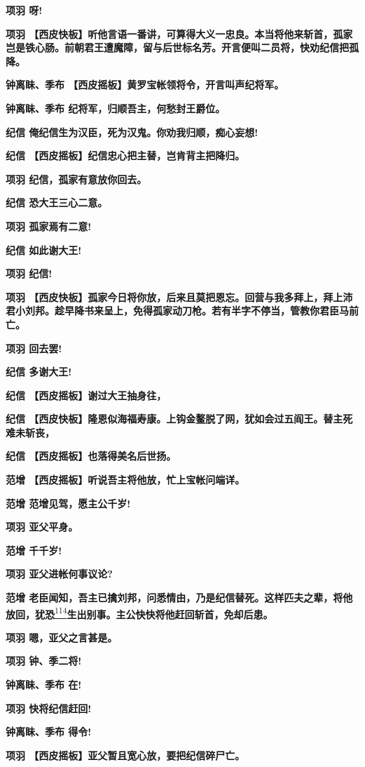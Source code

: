 \textbf{项羽 呀!}

\textbf{项羽
【西皮快板】听他言语一番讲，可算得大义一忠良。本当将他来斩首，孤家岂是铁心肠。前朝君王遭魔障，留与后世标名芳。开言便叫二员将，快劝纪信把孤降。}

\textbf{钟离眛、季布 【西皮摇板】黄罗宝帐领将令，开言叫声纪将军。}

\textbf{钟离眛、季布 纪将军，归顺吾主，何愁封王爵位。}

\textbf{纪信 俺纪信生为汉臣，死为汉鬼。你劝我归顺，痴心妄想!}

\textbf{纪信 【西皮摇板】纪信忠心把主替，岂肯背主把降归。}

\textbf{项羽 纪信，孤家有意放你回去。}

\textbf{纪信 恐大王三心二意。}

\textbf{项羽 孤家焉有二意!}

\textbf{纪信 如此谢大王!}

\textbf{项羽 纪信!}

\textbf{项羽
【西皮快板】孤家今日将你放，后来且莫把恩忘。回营与我多拜上，拜上沛君小刘邦。趁早降书来呈上，免得孤家动刀枪。若有半字不停当，管教你君臣马前亡。}

\textbf{项羽 回去罢!}

\textbf{纪信 多谢大王!}

\textbf{纪信 【西皮摇板】谢过大王抽身往，}

\textbf{纪信
【西皮快板】隆恩似海福寿康。上钩金鳌脱了网，犹如会过五阎王。替主死难未斩丧，}

\textbf{纪信 【西皮摇板】也落得美名后世扬。}

\textbf{范增 【西皮摇板】听说吾主将他放，忙上宝帐问端详。}

\textbf{范增 范增见驾，愿主公千岁!}

\textbf{项羽 亚父平身。}

\textbf{范增 千千岁!}

\textbf{项羽 亚父进帐何事议论?}

\textbf{范增
老臣闻知，吾主已擒刘邦，问悉情由，乃是纪信替死。这样匹夫之辈，将他放回，犹恐}\protect\hyperlink{fn114}{\textsuperscript{114}}\textbf{生出别事。主公快快将他赶回斩首，免却后患。}

\textbf{项羽 嗯，亚父之言甚是。}

\textbf{项羽 钟、季二将!}

\textbf{钟离眛、季布 在!}

\textbf{项羽 快将纪信赶回!}

\textbf{钟离眛、季布 得令!}

\textbf{项羽 【西皮摇板】亚父暂且宽心放，要把纪信碎尸亡。}

